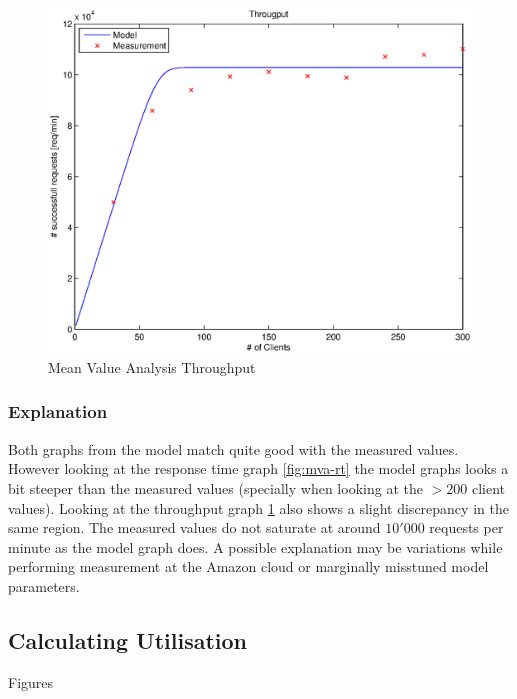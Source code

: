 \documentclass[a4paper]{article}
\begin{document}
\begin{figure}[H]
	\begin{center}
    \includegraphics[scale=0.6]{../plots-ms2-mg/mva-tp.eps}
  \end{center}
  \caption{Mean Value Analysis Throughput}
  \label{fig:mva-tp}
\end{figure}



\subsubsection{Explanation}
Both graphs from the model match quite good with the measured values. However looking at the response time graph \ref{fig:mva-rt} the model graphs looks a bit steeper than the measured values (specially when looking at the $>200$ client values). Looking at the throughput graph \ref{fig:mva-tp} also shows a slight discrepancy in the same region. The measured values do not saturate at around $10'000$ requests per minute as the model graph does. A possible explanation may be variations while performing measurement at the Amazon cloud or marginally misstuned model parameters.


\subsection{Calculating Utilisation}

Figures 


\end{document}
